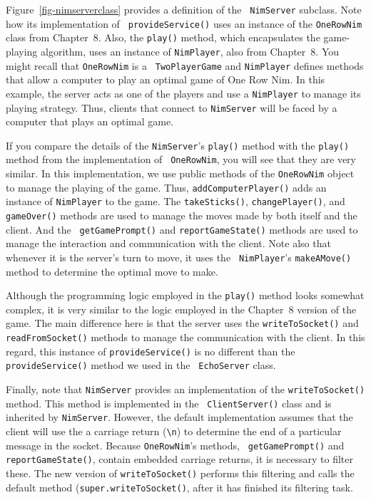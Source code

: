 Figure~\ref{fig-nimserverclass} provides a definition of the {\tt
NimServer} subclass. Note how its implementation of {\tt
provideService()} uses an instance of the {\tt OneRowNim} class from
Chapter~8. Also, the {\tt play()} method, which encapsulates the
game-playing algorithm, uses an instance of {\tt NimPlayer}, also from
Chapter~8. You might recall that {\tt OneRowNim} is a {\tt
TwoPlayerGame} and {\tt NimPlayer} defines methods that allow a
computer to play an optimal game of One Row Nim.  In this example, the
server acts as one of the players and use a {\tt NimPlayer} to manage
its playing strategy.  Thus, clients that connect to {\tt NimServer}
will be faced by a computer that plays an optimal game.

If you compare the details of the {\tt NimServer}'s {\tt play()}
method with the {\tt play()} method from the implementation of {\tt
OneRowNim}, you will see that they are very similar.  In this
implementation, we use public methods of the {\tt OneRowNim} object to
manage the playing of the game. Thus, {\tt addComputerPlayer()} adds
an instance of {\tt NimPlayer} to the game. The {\tt takeSticks()},
{\tt changePlayer()}, and {\tt gameOver()} methods are used to manage
the moves made by both itself and the client.  And the {\tt
getGamePrompt()} and {\tt reportGameState()} methods are used to
manage the interaction and communication with the client.  Note also
that whenever it is the server's turn to move, it uses the {\tt
NimPlayer}'s {\tt makeAMove()} method to determine the optimal move to
make.

Although the programming logic employed in the {\tt play()}
method looks somewhat complex, it is very similar to the logic
employed in the Chapter~8 version of the game. The main difference
here is that the server uses the {\tt writeToSocket()} and {\tt
readFromSocket()} methods to manage the communication with the client.
In this regard, this instance of {\tt provideService()} is no
different than the {\tt provideService()} method we used in the {\tt
EchoServer} class.

Finally, note that {\tt NimServer} provides an implementation of the
{\tt writeToSocket()} method. This method is implemented in the {\tt
ClientServer()} class and is inherited by {\tt NimServer}.  However,
the default implementation assumes that the client will use the a
carriage return ({\tt \verb|\n|}) to determine the end of a particular
message in the socket.  Because {\tt OneRowNim}'s methods, {\tt
getGamePrompt()} and {\tt reportGameState()}, contain embedded
carriage returns, it is necessary to filter these. 
The new version of {\tt writeToSocket()} performs this filtering and calls the
default method ({\tt super.writeToSocket()}, after it has finished its
filtering task.

